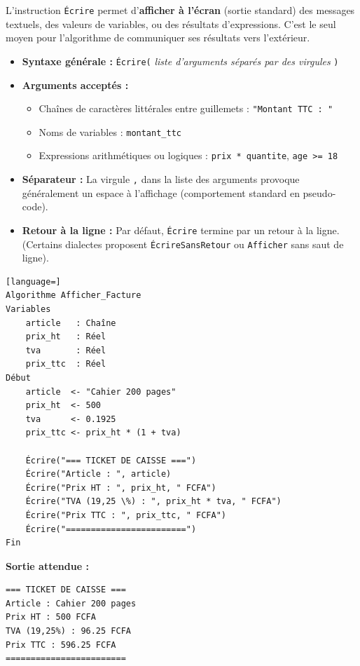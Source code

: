 \documentclass[11pt]{article}
\begin{document}
\begin{definition}
L'instruction \texttt{Écrire} permet d'\textbf{afficher à l'écran} (sortie standard) des messages textuels, des valeurs de variables, ou des résultats d'expressions. C'est le seul moyen pour l'algorithme de communiquer ses résultats vers l'extérieur.
\end{definition}

\begin{propriete}
\begin{itemize}
    \item \textbf{Syntaxe générale :} \texttt{Écrire(} \emph{liste d'arguments séparés par des virgules} \texttt{)}
    \item \textbf{Arguments acceptés :}
    \begin{itemize}
        \item Chaînes de caractères littérales entre guillemets : \texttt{"Montant TTC : "}
        \item Noms de variables : \texttt{montant\_ttc}
        \item Expressions arithmétiques ou logiques : \texttt{prix * quantite}, \texttt{age >= 18}
    \end{itemize}
    \item \textbf{Séparateur :} La virgule \texttt{,} dans la liste des arguments provoque généralement un espace à l'affichage (comportement standard en pseudo-code).
    \item \textbf{Retour à la ligne :} Par défaut, \texttt{Écrire} termine par un retour à la ligne. (Certains dialectes proposent \texttt{ÉcrireSansRetour} ou \texttt{Afficher} sans saut de ligne).
\end{itemize}
\end{propriete}

\begin{exemplebox}
\begin{lstlisting}[language=]
Algorithme Afficher_Facture
Variables
    article   : Chaîne
    prix_ht   : Réel
    tva       : Réel
    prix_ttc  : Réel
Début
    article  <- "Cahier 200 pages"
    prix_ht  <- 500
    tva      <- 0.1925
    prix_ttc <- prix_ht * (1 + tva)
    
    Écrire("=== TICKET DE CAISSE ===")
    Écrire("Article : ", article)
    Écrire("Prix HT : ", prix_ht, " FCFA")
    Écrire("TVA (19,25 \%) : ", prix_ht * tva, " FCFA")
    Écrire("Prix TTC : ", prix_ttc, " FCFA")
    Écrire("========================")
Fin
\end{lstlisting}
\textbf{Sortie attendue :}
\begin{lstlisting}
=== TICKET DE CAISSE ===
Article : Cahier 200 pages
Prix HT : 500 FCFA
TVA (19,25%) : 96.25 FCFA
Prix TTC : 596.25 FCFA
========================
\end{lstlisting}
\end{exemplebox}
\end{document}
